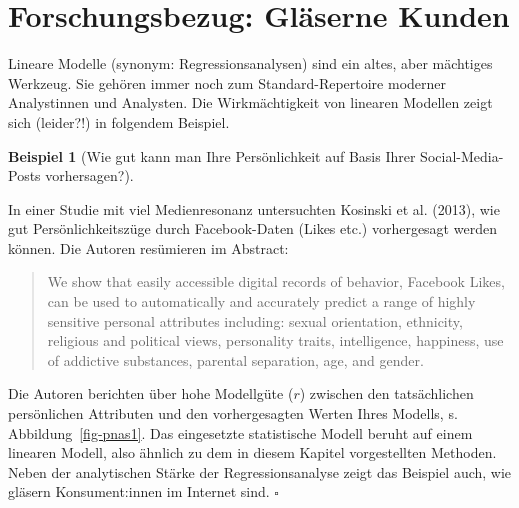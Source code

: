 \documentclass[
  letterpaper,
  oneside,
  open=any]{scrbook}
\theoremstyle{definition}
\theoremstyle{definition}
\newtheorem{example}{Beispiel}[chapter]
\theoremstyle{definition}
\theoremstyle{remark}
\begin{document}
\section{Forschungsbezug: Gläserne
Kunden}\label{forschungsbezug-gluxe4serne-kunden}

Lineare Modelle (synonym: Regressionsanalysen) sind ein altes, aber
mächtiges Werkzeug. Sie gehören immer noch zum Standard-Repertoire
moderner Analystinnen und Analysten. Die Wirkmächtigkeit von linearen
Modellen zeigt sich (leider?!) in folgendem Beispiel.

\begin{example}[Wie gut kann man Ihre Persönlichkeit auf Basis Ihrer
Social-Media-Posts
vorhersagen?]\protect\hypertarget{exm-kosinski}{}\label{exm-kosinski}

In einer Studie mit viel Medienresonanz untersuchten Kosinski et al.
(2013), wie gut Persönlichkeitszüge durch Facebook-Daten (Likes etc.)
vorhergesagt werden können. Die Autoren resümieren im Abstract:

\begin{quote}
We show that easily accessible digital records of behavior, Facebook
Likes, can be used to automatically and accurately predict a range of
highly sensitive personal attributes including: sexual orientation,
ethnicity, religious and political views, personality traits,
intelligence, happiness, use of addictive substances, parental
separation, age, and gender.
\end{quote}

Die Autoren berichten über hohe Modellgüte (\(r\)) zwischen den
tatsächlichen persönlichen Attributen und den vorhergesagten Werten
Ihres Modells, s. Abbildung~\ref{fig-pnas1}. Das eingesetzte
statistische Modell beruht auf einem linearen Modell, also ähnlich zu
dem in diesem Kapitel vorgestellten Methoden. Neben der analytischen
Stärke der Regressionsanalyse zeigt das Beispiel auch, wie gläsern
Konsument:innen im Internet sind. \(\square\)

\end{example}
\end{document}

